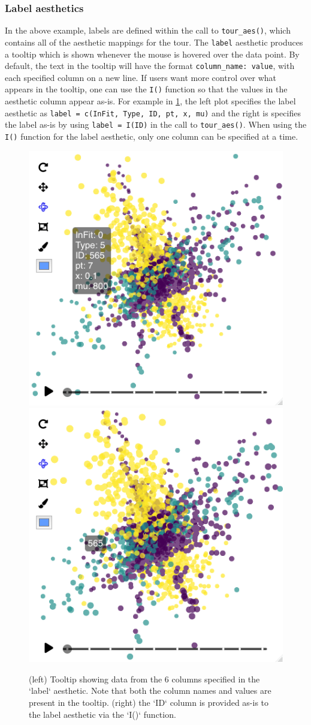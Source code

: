\hypertarget{label-aesthetics}{%
\subsubsection{Label aesthetics}\label{label-aesthetics}}

In the above example, labels are defined within the call to \texttt{tour\_aes()}, which contains all of the aesthetic mappings for the tour. The \texttt{label} aesthetic produces a tooltip which is shown whenever the mouse is hovered over the data point. By default, the text in the tooltip will have the format \texttt{column\_name:\ value}, with each specified column on a new line. If users want more control over what appears in the tooltip, one can use the \texttt{I()} function so that the values in the aesthetic column appear as-is. For example in \ref{fig:hover-tooltip}, the left plot specifies the label aesthetic as \texttt{label\ =\ c(InFit,\ Type,\ ID,\ pt,\ x,\ mu)} and the right is specifies the label as-is by using \texttt{label\ =\ I(ID)} in the call to \texttt{tour\_aes()}. When using the \texttt{I()} function for the label aesthetic, only one column can be specified at a time.

\begin{figure}
\includegraphics[width=0.5\linewidth]{figures/implementation/hover_tooltip} \includegraphics[width=0.5\linewidth]{figures/implementation/hover_tooltip_asis} \caption{(left) Tooltip showing data from the 6 columns specified in the `label` aesthetic. Note that both the column names and values are present in the tooltip. (right) the `ID` column is provided as-is to the label aesthetic via the `I()` function.}\label{fig:hover-tooltip}
\end{figure}

